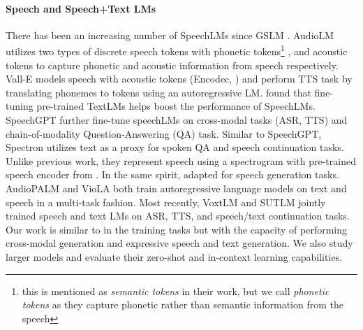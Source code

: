 \paragraph{Speech and Speech+Text LMs} There has been an increasing number of SpeechLMs since GSLM \citep{gslm}.
AudioLM \citep{borsos2023audiolm} utilizes two types of discrete speech tokens with phonetic tokens\footnote{this is mentioned as \textit{semantic tokens} in their work, but we call \textit{phonetic tokens} as they capture phonetic rather than semantic information from the speech} \citep{chung2021w2vbert}, %
 and acoustic tokens %
\citep{zeghidour2021soundstream} to capture phonetic and acoustic information from speech respectively. %
Vall-E \citep{Wang2023VallE} models speech with acoustic tokens (Encodec, \citealp{defossez2022highfi}) and perform TTS task by translating phonemes to tokens using an autoregressive LM.
\citet{hassid2023textually} found that fine-tuning pre-trained TextLMs helps boost the performance of SpeechLMs.
SpeechGPT \citep{zhang2023speechgpt} further fine-tune speechLMs on cross-modal tasks (ASR, TTS) and chain-of-modality Question-Answering (QA) task. %
Similar to SpeechGPT, Spectron \citep{nachmani2023spoken} utilizes text as a proxy for spoken QA and speech continuation tasks. %
Unlike previous work, they represent speech using a spectrogram with pre-trained speech encoder from \citealp{zhang2023usm}. %
In the same spirit, \citet{fathullah2023generalpurpose} adapted \llamatwo  for speech generation tasks. %
AudioPALM \cite{rubenstein2023audiopalm} and VioLA \cite{wang2023viola} both train autoregressive language models on text and speech in a multi-task fashion. %
Most recently, VoxtLM \citep{maiti2023voxtlm} and SUTLM \citep{chou2023toward} jointly trained speech and text LMs on ASR, TTS, and speech/text continuation tasks.
Our work is similar to \citet{chou2023toward} in the training tasks but with the capacity of performing cross-modal generation and expressive speech and text generation.
We also study larger models and evaluate their zero-shot and in-context learning capabilities.

